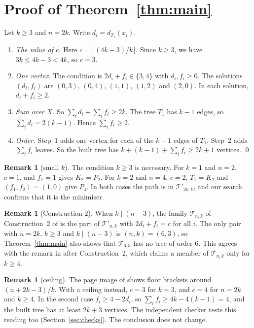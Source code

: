 \documentclass[11pt]{article}
\theoremstyle{definition}
\newtheorem{remark}[theorem]{Remark}
\newcommand{\Tp}{\mathcal{T}'}
\begin{document}
\section{Proof of Theorem~\ref{thm:main}}

Let $k \ge 3$ and $n = 2k$. Write $d_i = d_{T_1}(x_i)$.

\begin{enumerate}
\item \emph{The value of $c$.} Here $c = \lfloor (4k-3)/k \rfloor$. Since $k \ge 3$, we have
$3k \le 4k-3 < 4k$, so $c = 3$.
\item \emph{One vertex.} The condition is $2d_i + f_i \in \{3,4\}$ with $d_i, f_i \ge 0$.
The solutions $(d_i, f_i)$ are $(0,3)$, $(0,4)$, $(1,1)$, $(1,2)$ and $(2,0)$. In each
solution, $d_i + f_i \ge 2$.
\item \emph{Sum over $X$.} So $\sum_i d_i + \sum_i f_i \ge 2k$. The tree $T_1$ has $k-1$
edges, so $\sum_i d_i = 2(k-1)$. Hence $\sum_i f_i \ge 2$.
\item \emph{Order.} Step~1 adds one vertex for each of the $k-1$ edges of $T_1$. Step~2
adds $\sum_i f_i$ leaves. So the built tree has
$k + (k-1) + \sum_i f_i \ge 2k+1$ vertices. \qed
\end{enumerate}

\begin{remark}[small $k$]
The condition $k \ge 3$ is necessary. For $k = 1$ and $n = 2$, $c = 1$, and $f_1 = 1$
gives $K_2 = P_2$. For $k = 2$ and $n = 4$, $c = 2$, $T_1 = K_2$ and $(f_1, f_2) = (1,0)$
give $P_4$. In both cases the path is in $\Tp_{2k,k}$, and our search confirms that it is
the minimiser.
\end{remark}

\begin{remark}[Construction 2]
When $k \mid (n-3)$, the family $\mathcal{T}_{n,k}$ of Construction~2 of \cite{HT} is the
part of $\Tp_{n,k}$ with $2d_i + f_i = c$ for all $i$. The only pair with $n = 2k$,
$k \ge 3$ and $k \mid (n-3)$ is $(n,k) = (6,3)$, so Theorem~\ref{thm:main} also shows that
$\mathcal{T}_{6,3}$ has no tree of order 6. This agrees with the remark in \cite{HT}
after Construction~2, which claims a member of $\mathcal{T}_{n,k}$ only for $k \ge 4$.
\end{remark}

\begin{remark}[ceiling]
The page image of \cite{HT} shows floor brackets around $(n+2k-3)/k$. With a ceiling
instead, $c = 3$ for $k = 3$, and $c = 4$ for $n = 2k$ and $k \ge 4$. In the second case
$f_i \ge 4 - 2d_i$, so $\sum_i f_i \ge 4k - 4(k-1) = 4$, and the built tree has at least
$2k+3$ vertices. The independent checker tests this reading too
(Section~\ref{sec:checks}). The conclusion does not change.
\end{remark}
\end{document}
